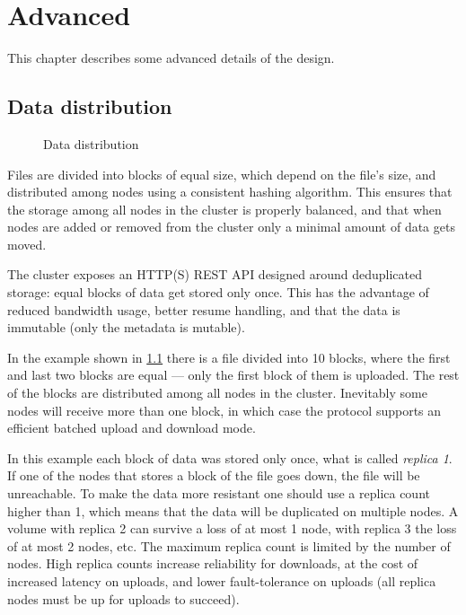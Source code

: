 \chapter{Advanced}
This chapter describes some advanced details of the \SX design.

\section{Data distribution}

\begin{figure}
	\centering
	
	\caption{Data distribution}
	\label{fig:dist}
\end{figure}

Files are divided into blocks of equal size, which depend on the file's size,
and distributed among \SX nodes using a consistent hashing algorithm. This
ensures that the storage among all nodes in the cluster is properly balanced,
and that when nodes are added or removed from the cluster only a minimal amount
of data gets moved.

The cluster exposes an HTTP(S) REST API designed around deduplicated storage:
equal blocks of data get stored only once. This has the advantage of reduced
bandwidth usage, better resume handling, and that the data is immutable (only
the metadata is mutable).

In the example shown in {\ifpdf{}\else\ref{fig:dist}\fi} there is
a file divided into 10 blocks, where the first and last two blocks are
equal --- only the first block of them is uploaded. The rest of the
blocks are distributed among all nodes in the cluster. Inevitably some
nodes will receive more than one block, in which case the protocol
supports an efficient batched upload and download mode.

In this example each block of data was stored only once, what is called
\emph{replica 1}. If one of the nodes that stores a block of the file goes down,
the file will be unreachable. To make the data more resistant one should
use a replica count higher than 1, which means that the data will be
duplicated on multiple nodes. A volume with replica 2 can survive a loss of
at most 1 node, with replica 3 the loss of at most 2 nodes, etc. The maximum
replica count is limited by the number of nodes. High replica counts increase
reliability for downloads, at the cost of increased latency on uploads, and
lower fault-tolerance on uploads (all replica nodes must be up for uploads to
succeed).

